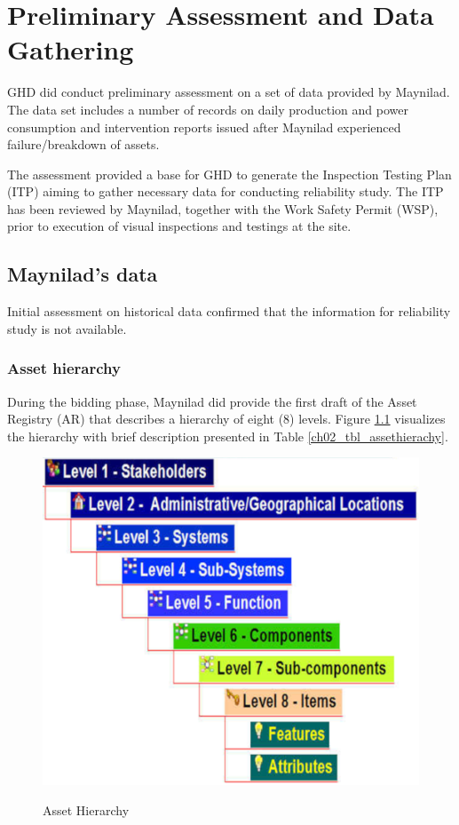 \chapter{Preliminary Assessment and Data Gathering} %
\label{Chapter2}
GHD did conduct preliminary assessment on a set of data provided by Maynilad. The data set includes a number of records on daily production and power consumption and intervention reports issued after Maynilad experienced failure/breakdown of assets.

The assessment provided a base for GHD to generate the Inspection Testing Plan (ITP) \cite{GHD2018n} aiming to gather necessary data for conducting reliability study. The ITP has been reviewed by Maynilad, together with the Work Safety Permit (WSP), prior to execution of visual inspections and testings at the site.

\section{Maynilad's data}
\label{21}
Initial assessment on historical data confirmed that the information for reliability study is not available.

\subsection{Asset hierarchy}
\label{214}
During the bidding phase, Maynilad did provide the first draft of the Asset Registry (AR) that describes a hierarchy of eight (8) levels. Figure \ref{ch02_assethierachy} visualizes the hierarchy with brief description presented in Table \ref{ch02_tbl_assethierachy}.

\begin{figure}[!htb]
	\includegraphics[scale=1.3]{figures/ch02_assethierarchy} \\
	\caption{Asset Hierarchy}
	\label{ch02_assethierachy} 
\end{figure}

